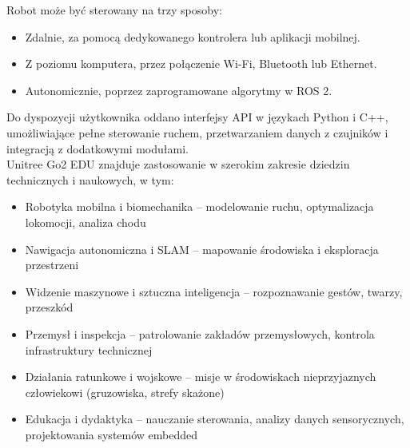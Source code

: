 \documentclass[12pt]{article}
\begin{document}
\noindent Robot może być sterowany na trzy sposoby:
\begin{itemize}
    \item Zdalnie, za pomocą dedykowanego kontrolera lub aplikacji mobilnej.
    \item Z poziomu komputera, przez połączenie Wi-Fi, Bluetooth lub Ethernet.
    \item Autonomicznie, poprzez zaprogramowane algorytmy w ROS 2.
\end{itemize}
Do dyspozycji użytkownika oddano interfejsy API w językach Python i C++, umożliwiające pełne sterowanie ruchem, przetwarzaniem danych z czujników i integracją z dodatkowymi modułami.\\

\noindent Unitree Go2 EDU znajduje zastosowanie w szerokim zakresie dziedzin technicznych i naukowych, w tym:
\begin{itemize}
    \item Robotyka mobilna i biomechanika – modelowanie ruchu, optymalizacja lokomocji, analiza chodu
    \item Nawigacja autonomiczna i SLAM – mapowanie środowiska i eksploracja przestrzeni
    \item Widzenie maszynowe i sztuczna inteligencja – rozpoznawanie gestów, twarzy, przeszkód
    \item Przemysł i inspekcja – patrolowanie zakładów przemysłowych, kontrola infrastruktury technicznej
    \item Działania ratunkowe i wojskowe – misje w środowiskach nieprzyjaznych człowiekowi (gruzowiska, strefy skażone)
    \item Edukacja i dydaktyka – nauczanie sterowania, analizy danych sensorycznych, projektowania systemów embedded
\end{itemize}
\end{document}
